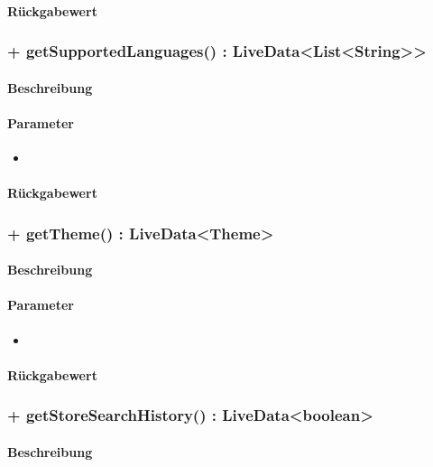 \paragraph*{Rückgabewert}


\subsubsection{+ getSupportedLanguages() : LiveData<List<String>>}%
\paragraph*{Beschreibung}

\paragraph*{Parameter}
\begin{itemize}
    \item 
\end{itemize}
\paragraph*{Rückgabewert}


\subsubsection{+ getTheme() : LiveData<Theme>}%
\paragraph*{Beschreibung}

\paragraph*{Parameter}
\begin{itemize}
    \item 
\end{itemize}
\paragraph*{Rückgabewert}


\subsubsection{+ getStoreSearchHistory() : LiveData<boolean>}%
\paragraph*{Beschreibung}

